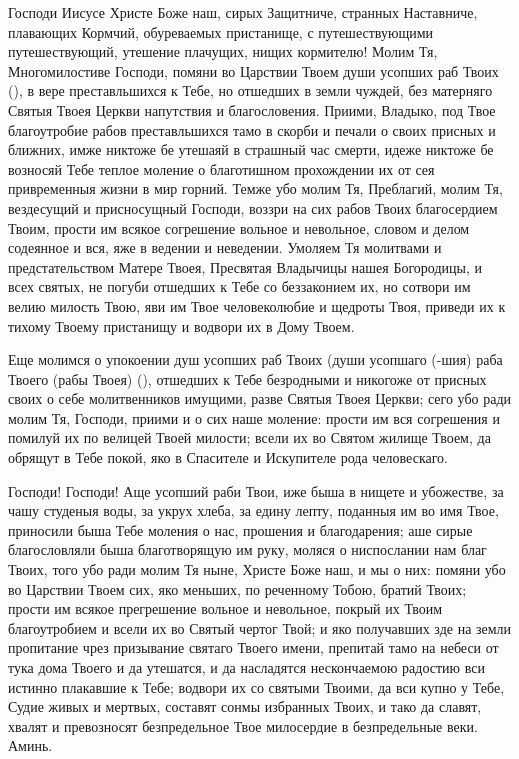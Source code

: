 \mychapterending


\begin{mymulticols}
 


Господи Иисусе Христе Боже наш, сирых Защитниче, странных Наставниче, плавающих Кормчий, обуреваемых пристанище, с путешествующими путешествующий, утешение плачущих, нищих кормителю! Молим Тя, Многомилостиве Господи, помяни во Царствии Твоем души усопших раб Твоих (), в вере преставльшихся к Тебе, но отшедших в земли чуждей, без матерняго Святыя Твоея Церкви напутствия и благословения. Приими, Владыко, под Твое благоутробие рабов преставльшихся тамо в скорби и печали о своих присных и ближних, имже никтоже бе утешаяй в страшный час смерти, идеже никтоже бе возносяй Тебе теплое моление о благотишном прохождении их от сея привременныя жизни в мир горний. Темже убо молим Тя, Преблагий, молим Тя, вездесущий и присносущный Господи, воззри на сих рабов Твоих благосердием Твоим, прости им всякое согрешение вольное и невольное, словом и делом содеянное и вся, яже в ведении и неведении. Умоляем Тя молитвами и предстательством Матере Твоея, Пресвятая Владычицы нашея Богородицы, и всех святых, не погуби отшедших к Тебе со беззаконием их, но сотвори им велию милость Твою, яви им Твое человеколюбие и щедроты Твоя, приведи их к тихому Твоему пристанищу и водвори их в Дому Твоем. 

Еще молимся о упокоении душ усопших раб Твоих (души усопшаго (-шия) раба Твоего (рабы Твоея) (), отшедших к Тебе безродными и никогоже от присных своих о себе молитвенников имущими, разве Святыя Твоея Церкви; сего убо ради молим Тя, Господи, приими и о сих наше моление: прости им вся согрешения и помилуй их по велицей Твоей милости; всели их во Святом жилище Твоем, да обрящут в Тебе покой, яко в Спасителе и Искупителе рода человескаго. 

Господи! Господи! Аще усопший раби Твои, иже быша в нищете и убожестве, за чашу студеныя воды, за укрух хлеба, за едину лепту, поданныя им во имя Твое, приносили быша Тебе моления о нас, прошения и благодарения; аше сирые благословляли быша благотворящую им руку, моляся о ниспослании нам благ Твоих, того убо ради молим Тя ныне, Христе Боже наш, и мы о них: помяни убо во Царствии Твоем сих, яко меньших, по реченному Тобою, братий Твоих; прости им всякое прегрешение вольное и невольное, покрый их Твоим благоутробием и всели их во Святый чертог Твой; и яко получавших зде на земли пропитание чрез призывание святаго Твоего имени, препитай тамо на небеси от тука дома Твоего и да утешатся, и да насладятся нескончаемою радостию вси истинно плакавшие к Тебе; водвори их со святыми Твоими, да вси купно у Тебе, Судие живых и мертвых, составят сонмы избранных Твоих, и тако да славят, хвалят и превозносят безпредельное Твое милосердие в безпредельные веки. Аминь. 

\end{mymulticols}

